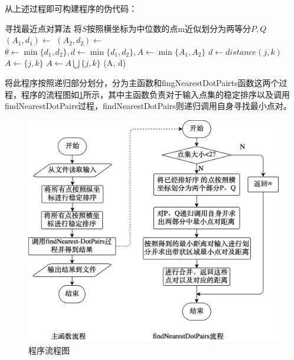 \documentclass{report}
\begin{document}
从上述过程即可构建程序的伪代码：\par
\begin{simpleAlgorithm}{寻找最近点对算法}
    \State 将$S$按照横坐标为中位数的点m近似划分为两等分$P,Q$
    \State $(A_1, d_1) \gets $ 
    \State $(A_2, d_2) \gets $ 
    \State $\theta \gets \min\{d_1, d_2\}, d \gets \min\{d_1, d_2\}, A \gets \min\{A_1, A_2\}$
            \State $d \gets distance(j, k)$
            \State $A \gets \{j, k\}$
            \State $A \gets A \bigcup \{j, k\}$
        \EndIf
        \EndFor
    \EndFor
    \State \Return (A, d)
    \EndProcedure
\end{simpleAlgorithm}

将此程序按照递归部分划分，分为主函数和fingNearestDotPairts函数这两个过程，程序的流程图如\ref{fig:flowchart1}所示，其中主函数负责对于输入点集的稳定排序以及调用findNearestDotPairs过程，findNearestDotPairs则递归调用自身寻找最小点对。
\begin{figure}[ht]
    \centering
    \includegraphics[width=0.7\linewidth]{flowchart1.png}
    \caption{程序流程图}
    \label{fig:flowchart1}
\end{figure}
\end{document}
